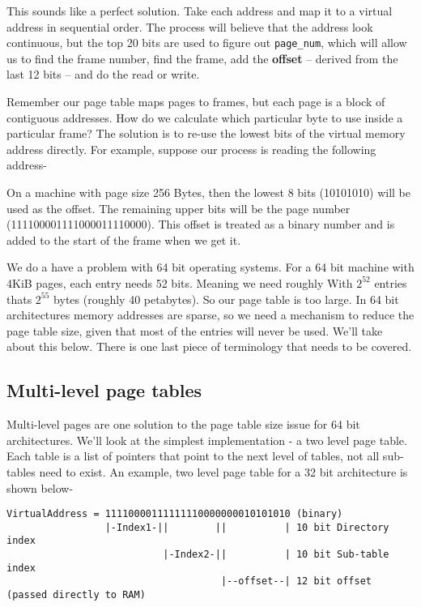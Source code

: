 This sounds like a perfect solution.
Take each address and map it to a virtual address in sequential order.
The process will believe that the address look continuous, but the top 20 bits are used to figure out \texttt{page\_num},
which will allow us to find the frame number, find the frame, add the \textbf{offset} -- derived from the last 12 bits -- and do the read or write.

Remember our page table maps pages to frames, but each page is a block of contiguous addresses.
How do we calculate which particular byte to use inside a particular frame?
The solution is to re-use the lowest bits of the virtual memory address directly.
For example, suppose our process is reading the following address- 

On a machine with page size 256 Bytes, then the lowest 8 bits (10101010) will be used as the offset. The remaining upper bits will be the page number (111100001111000011110000). This offset is treated as a binary number and is added to the start of the frame when we get it.

We do a have a problem with 64 bit operating systems.
For a 64 bit machine with 4KiB pages, each entry needs 52 bits.
Meaning we need roughly
With $2^{52}$ entries thats $2^{55}$ bytes (roughly 40 petabytes).
So our page table is too large.
In 64 bit architectures memory addresses are sparse, so we need a mechanism to reduce the page table size, given that most of the entries will never be used.
We'll take about this below. There is one last piece of terminology that needs to be covered.

\subsection{Multi-level page tables}
Multi-level pages are one solution to the page table size issue for 64 bit architectures. We'll look at the simplest implementation - a two level page table. Each table is a list of pointers that point to the next level of tables, not all sub-tables need to exist. An example, two level page table for a 32 bit architecture is shown below-

\begin{verbatim}
VirtualAddress = 11110000111111110000000010101010 (binary)
                 |-Index1-||        ||          | 10 bit Directory index
                           |-Index2-||          | 10 bit Sub-table index
                                     |--offset--| 12 bit offset (passed directly to RAM)
\end{verbatim}

